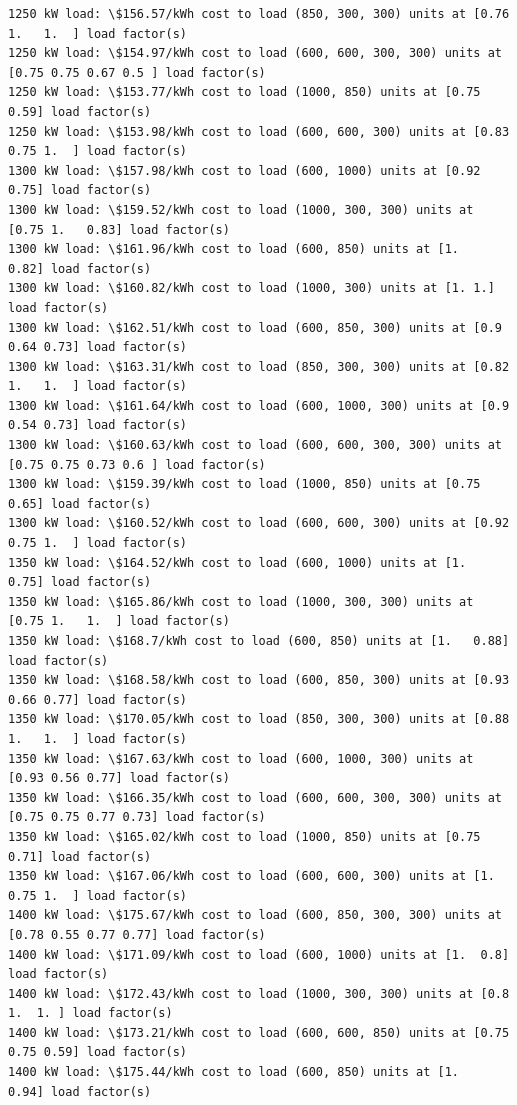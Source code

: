\documentclass[11pt]{article}
\begin{document}
\begin{Verbatim}[commandchars=\\\{\}]
1250 kW load: \$156.57/kWh cost to load (850, 300, 300) units at [0.76 1.   1.  ] load factor(s)
1250 kW load: \$154.97/kWh cost to load (600, 600, 300, 300) units at [0.75 0.75 0.67 0.5 ] load factor(s)
1250 kW load: \$153.77/kWh cost to load (1000, 850) units at [0.75 0.59] load factor(s)
1250 kW load: \$153.98/kWh cost to load (600, 600, 300) units at [0.83 0.75 1.  ] load factor(s)
1300 kW load: \$157.98/kWh cost to load (600, 1000) units at [0.92 0.75] load factor(s)
1300 kW load: \$159.52/kWh cost to load (1000, 300, 300) units at [0.75 1.   0.83] load factor(s)
1300 kW load: \$161.96/kWh cost to load (600, 850) units at [1.   0.82] load factor(s)
1300 kW load: \$160.82/kWh cost to load (1000, 300) units at [1. 1.] load factor(s)
1300 kW load: \$162.51/kWh cost to load (600, 850, 300) units at [0.9  0.64 0.73] load factor(s)
1300 kW load: \$163.31/kWh cost to load (850, 300, 300) units at [0.82 1.   1.  ] load factor(s)
1300 kW load: \$161.64/kWh cost to load (600, 1000, 300) units at [0.9  0.54 0.73] load factor(s)
1300 kW load: \$160.63/kWh cost to load (600, 600, 300, 300) units at [0.75 0.75 0.73 0.6 ] load factor(s)
1300 kW load: \$159.39/kWh cost to load (1000, 850) units at [0.75 0.65] load factor(s)
1300 kW load: \$160.52/kWh cost to load (600, 600, 300) units at [0.92 0.75 1.  ] load factor(s)
1350 kW load: \$164.52/kWh cost to load (600, 1000) units at [1.   0.75] load factor(s)
1350 kW load: \$165.86/kWh cost to load (1000, 300, 300) units at [0.75 1.   1.  ] load factor(s)
1350 kW load: \$168.7/kWh cost to load (600, 850) units at [1.   0.88] load factor(s)
1350 kW load: \$168.58/kWh cost to load (600, 850, 300) units at [0.93 0.66 0.77] load factor(s)
1350 kW load: \$170.05/kWh cost to load (850, 300, 300) units at [0.88 1.   1.  ] load factor(s)
1350 kW load: \$167.63/kWh cost to load (600, 1000, 300) units at [0.93 0.56 0.77] load factor(s)
1350 kW load: \$166.35/kWh cost to load (600, 600, 300, 300) units at [0.75 0.75 0.77 0.73] load factor(s)
1350 kW load: \$165.02/kWh cost to load (1000, 850) units at [0.75 0.71] load factor(s)
1350 kW load: \$167.06/kWh cost to load (600, 600, 300) units at [1.   0.75 1.  ] load factor(s)
1400 kW load: \$175.67/kWh cost to load (600, 850, 300, 300) units at [0.78 0.55 0.77 0.77] load factor(s)
1400 kW load: \$171.09/kWh cost to load (600, 1000) units at [1.  0.8] load factor(s)
1400 kW load: \$172.43/kWh cost to load (1000, 300, 300) units at [0.8 1.  1. ] load factor(s)
1400 kW load: \$173.21/kWh cost to load (600, 600, 850) units at [0.75 0.75 0.59] load factor(s)
1400 kW load: \$175.44/kWh cost to load (600, 850) units at [1.   0.94] load factor(s)

\end{Verbatim}
\end{document}
